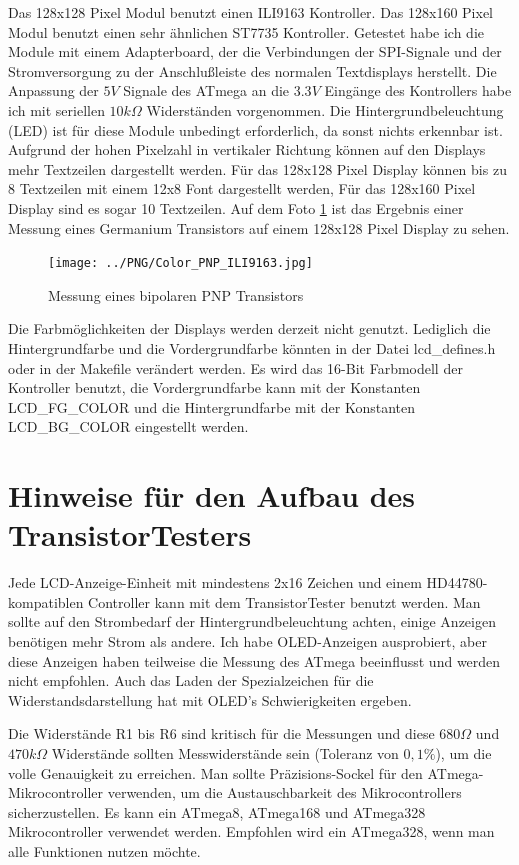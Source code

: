 Das 128x128 Pixel Modul benutzt einen ILI9163 Kontroller.
Das 128x160 Pixel Modul benutzt einen sehr ähnlichen ST7735 Kontroller.
Getestet habe ich die Module mit einem Adapterboard, der die Verbindungen
der SPI-Signale und der Stromversorgung zu der Anschlußleiste des normalen Textdisplays
herstellt. Die Anpassung der \(5V\) Signale des ATmega an die \(3.3V\) Eingänge des Kontrollers
habe ich mit seriellen \(10k\Omega\) Widerständen vorgenommen.
Die Hintergrundbeleuchtung (LED) ist für diese Module unbedingt erforderlich, da sonst
nichts erkennbar ist.
Aufgrund der hohen Pixelzahl in vertikaler Richtung können auf den Displays mehr Textzeilen dargestellt
werden. Für das 128x128 Pixel Display können bis zu 8 Textzeilen mit einem 12x8 Font dargestellt werden,
Für das 128x160 Pixel Display sind es sogar 10 Textzeilen.
Auf dem Foto \ref{fig:Color_PNP} ist das Ergebnis einer Messung eines Germanium Transistors auf einem
128x128 Pixel Display zu sehen.

\begin{figure}[H]
\centering
\texttt{[image: ../PNG/Color\_PNP\_ILI9163.jpg]}
\caption{Messung eines bipolaren PNP Transistors}
\label{fig:Color_PNP}
\end{figure}

Die Farbmöglichkeiten der Displays werden derzeit nicht genutzt. Lediglich die Hintergrundfarbe
und die Vordergrundfarbe könnten in der Datei lcd\_defines.h oder in der Makefile verändert werden.
Es wird das 16-Bit Farbmodell der Kontroller benutzt, die Vordergrundfarbe kann mit der Konstanten
LCD\_FG\_COLOR und die Hintergrundfarbe mit der Konstanten LCD\_BG\_COLOR eingestellt werden.

\section{Hinweise für den Aufbau des TransistorTesters}
Jede LCD-Anzeige-Einheit mit mindestens 2x16 Zeichen und einem HD44780-kompatiblen Controller kann mit
dem TransistorTester benutzt werden.
Man sollte auf den Strombedarf der Hintergrundbeleuchtung achten, einige Anzeigen benötigen
mehr Strom als andere.
Ich habe OLED-Anzeigen ausprobiert, aber diese Anzeigen haben teilweise die Messung des
ATmega beeinflusst und werden nicht empfohlen. Auch das Laden der Spezialzeichen für die 
Widerstandsdarstellung hat mit OLED's Schwierigkeiten ergeben.

Die Widerstände R1 bis R6 sind kritisch für die Messungen und diese \(680\Omega\) und
\(470k\Omega\) Widerstände sollten Messwiderstände sein (Toleranz von \(0,1\%\)), um 
die volle Genauigkeit zu erreichen.
Man sollte Präzisions-Sockel für den ATmega-Mikrocontroller verwenden, um
die Austauschbarkeit des Mikrocontrollers sicherzustellen.
Es kann ein ATmega8, ATmega168 und ATmega328 Mikrocontroller verwendet werden.
Empfohlen wird ein ATmega328, wenn man alle Funktionen nutzen möchte.


